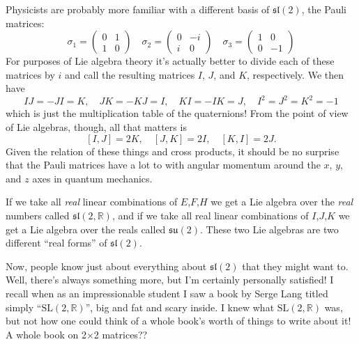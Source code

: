 \documentclass{article}
\begin{document}
Physicists are probably more familiar with a different basis of
\(\mathfrak{sl}(2)\), the Pauli matrices:
\[\sigma_1=\left(\begin{array}{cc}0&1\\1&0\end{array}\right) \quad \sigma_2=\left(\begin{array}{cc}0&-i\\i&0\end{array}\right) \quad \sigma_3=\left(\begin{array}{cc}1&0\\0&-1\end{array}\right)\]
For purposes of Lie algebra theory it's actually better to divide each
of these matrices by \(i\) and call the resulting matrices \(I\), \(J\),
and \(K\), respectively. We then have
\[IJ = -JI = K, \quad JK = -KJ = I, \quad KI = -IK = J, \quad I^2 = J^2 = K^2 = -1\]
which is just the multiplication table of the quaternions! From the
point of view of Lie algebras, though, all that matters is
\[[I,J] = 2K, \quad [J,K] = 2I, \quad [K,I] = 2J.\] Given the relation
of these things and cross products, it should be no surprise that the
Pauli matrices have a lot to with angular momentum around the \(x\),
\(y\), and \(z\) axes in quantum mechanics.

If we take all \emph{real} linear combinations of \(E\),\(F\),\(H\) we
get a Lie algebra over the \emph{real} numbers called
\(\mathfrak{sl}(2,\mathbb{R})\), and if we take all real linear
combinations of \(I\),\(J\),\(K\) we get a Lie algebra over the reals
called \(\mathfrak{su}(2)\). These two Lie algebras are two different
``real forms'' of \(\mathfrak{sl}(2)\).

Now, people know just about everything about \(\mathfrak{sl}(2)\) that
they might want to. Well, there's always something more, but I'm
certainly personally satisfied! I recall when as an impressionable
student I saw a book by Serge Lang titled simply
``\(\mathrm{SL}(2,\mathbb{R})\)'', big and fat and scary inside. I knew
what \(\mathrm{SL}(2,\mathbb{R})\) was, but not how one could think of a
whole book's worth of things to write about it! A whole book on 2×2
matrices??
\end{document}
